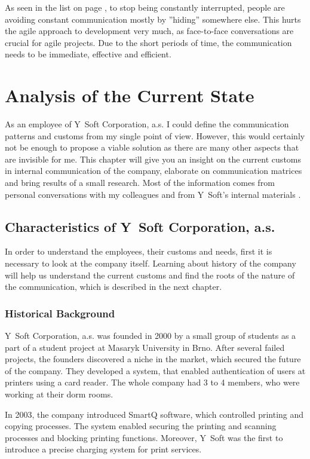 \documentclass[11pt,singleside]{myfithesis2}
\begin{document}
As seen in the list on page \pageref{list:avoidingCommunication}, to stop being constantly interrupted, people are avoiding constant communication mostly by ''hiding'' somewhere else. This hurts the agile approach to development very much, as face-to-face conversations are crucial for agile projects. Due to the short periods of time, the communication needs to be immediate, effective and efficient.
	
	
\chapter{Analysis of the Current State}

As an employee of Y~Soft Corporation, a.s. I could define the communication patterns and customs from my single point of view. However, this would certainly not be enough to propose a viable solution as there are many other aspects that are invisible for me. This chapter will give you an insight on the current customs in internal communication of the company, elaborate on communication matrices and bring results of a small research. Most of the information comes from personal conversations with my colleagues and from Y~Soft's internal materials \cite{ysoftInternal}.

	\section{Characteristics of Y~Soft Corporation, a.s.}
In order to understand the employees, their customs and needs, first it is necessary to look at the company itself. Learning about history of the company will help us understand the current customs and find the roots of the nature of the communication, which is described in the next chapter.

		\subsection{Historical Background}

Y~Soft Corporation, a.s. was founded in 2000 by a small group of students as a part of a student project at Masaryk University in Brno. After several failed projects, the founders discovered a niche in the market, which secured the future of the company. They developed a system, that enabled authentication of users at printers using a card reader. The whole company had 3 to 4 members, who were working at their dorm rooms.

In 2003, the company introduced SmartQ software, which controlled printing and copying processes. The system enabled securing the printing and scanning processes and blocking printing functions. Moreover, Y~Soft was the first to introduce a precise charging system for print services.
\end{document}
